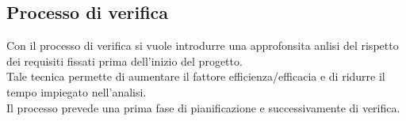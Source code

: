 


	\subsection{Processo di verifica}
	Con il processo di verifica si vuole introdurre una approfonsita anlisi del rispetto dei requisiti fissati prima dell'inizio del progetto.\\
	Tale tecnica permette di aumentare il fattore efficienza/efficacia e di ridurre il tempo impiegato nell'analisi.\\
	Il processo prevede una prima fase di pianificazione e successivamente di verifica.










